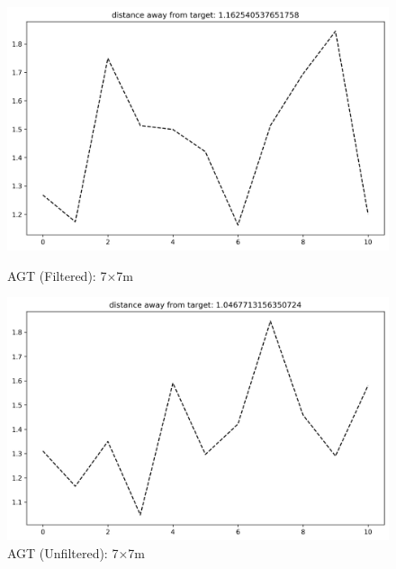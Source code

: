 \documentclass[runningheads]{llncs}
\begin{document}
\begin{figure}[H]
	\centering
	\begin{minipage}{0.49\textwidth}
		\centering
		\includegraphics[width=\textwidth]{figures/filtered/mlp_custom_7.png}
		\caption*{AGT (Filtered): 7×7m}
	\end{minipage}
	\hfill
	\begin{minipage}{0.49\textwidth}
		\centering
		\includegraphics[width=\textwidth]{figures/unfiltered/mlp_custom_7.png}
		\caption*{AGT (Unfiltered): 7×7m}
	\end{minipage}
\end{figure}
\end{document}
